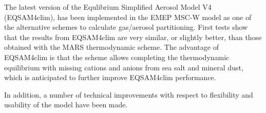 
The latest version of the Equlibrium Simplified Aerosol Model V4 (EQSAM4clim), has been implemented in the EMEP MSC-W model as one
of the alternative schemes to calculate gas/aerosol partitioning. First tests show that the results from EQSAM4clim are very similar, or slightly better, 
than those obtained with the MARS thermodynamic scheme. The advantage of EQSAM4clim is that the scheme allows completing the 
thermodynamic equilibrium with missing cations and anions from sea salt and mineral dust, which is anticipated to further
improve EQSAM4clim performance.

In addition, a number of technical improvements with respect to flexibility and usability of the model have been made. 
\\




